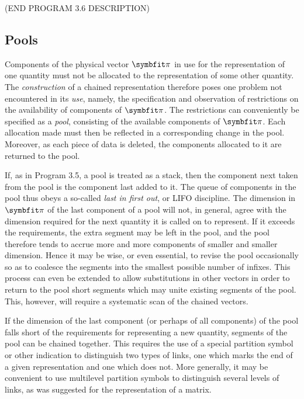 \par (END PROGRAM 3.6 DESCRIPTION)

\subsection*{Pools}

\par Components of the physical vector $\vect{\pi}$ in use for the representation of one quantity must not be allocated to the representation of some other quantity. The \textit{construction} of a chained representation therefore poses one problem not encountered in its \textit{use}, namely, the specification and observation of restrictions on the availability of components of $\vect{\pi}$. The restrictions can conveniently be specified as a \textit{pool}, consisting of the available components of $\vect{\pi}$. Each allocation made must then be reflected in a corresponding change in the pool. Moreover, as each piece of data is deleted, the components allocated to it are returned to the pool.

\par If, as in Program 3.5, a pool is treated as a stack, then the component next taken from the pool is the component last added to it. The queue of components in the pool thus obeys a so-called \textit{last in first out}, or LIFO discipline. The dimension in $\vect{\pi}$ of the last component of a pool will not, in general, agree with the dimension required for the next quantity it is called on to represent. If it exceeds the requirements, the extra segment may be left in the pool, and the pool therefore tends to accrue more and more components of smaller and smaller dimension. Hence it may be wise, or even essential, to revise the pool occasionally so as to coalesce the segments into the smallest possible number of infixes. This process can even be extended to allow substitutions in other vectors in order to return to the pool short segments which may unite existing segments of the pool. This, however, will require a systematic scan of the chained vectors.

\par If the dimension of the last component (or perhaps of all components) of the pool falls short of the requirements for representing a new quantity, segments of the pool can be chained together. This requires the use of a special partition symbol or other indication to distinguish two types of links, one which marks the end of a given representation and one which does not. More generally, it may be convenient to use multilevel partition symbols to distinguish several levels of links, as was suggested for the representation of a matrix.

